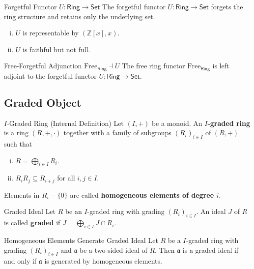 \begin{example}{Forgetful Functor $U:\mathsf{Ring}\to\mathsf{Set}$}{}
    The forgetful functor $U:\mathsf{Ring}\to\mathsf{Set}$ forgets the ring structure and retains only the underlying set.
    \begin{enumerate}[(i)]
        \item $U$ is representable by $\left(\mathbb{Z}[x],x\right)$.
        \item $U$ is faithful but not full.
    \end{enumerate}
\end{example}


\begin{proposition}{Free-Forgetful Adjunction $\mathrm{Free}_{\mathsf{Ring}}\dashv U$}{}
    The free ring functor $\mathrm{Free}_{\mathsf{Ring}}$ is left adjoint to the forgetful functor $U:\mathsf{Ring}\to\mathsf{Set}$.
\end{proposition}




\subsection{Graded Object}
\begin{definition}{$I$-Graded Ring (Internal Definition)}{}
    Let $(I,+)$ be a monoid. An \textbf{$I$-graded ring} is a ring $(R,+,\cdot)$ together with a family of subgroups $(R_i)_{i\in I}$ of $(R,+)$ such that
    \begin{enumerate}[(i)]
        \item $R=\bigoplus_{i\in I}R_i$.
        \item $R_iR_j\subseteq R_{i+j}$ for all $i,j\in I$.
    \end{enumerate}
    Elements in $R_i-\{0\}$ are called \textbf{homogeneous elements of degree $i$}.
\end{definition}

\begin{definition}{Graded Ideal}{}
    Let $R$ be an $I$-graded ring with grading $(R_i)_{i\in I}$. An ideal $J$ of $R$ is called \textbf{graded} if $J=\bigoplus_{i\in I}J\cap R_i$.
\end{definition}

\begin{proposition}{Homogeneous Elements Generate Graded Ideal}{}
    Let $R$ be a $I$-graded ring with grading $(R_i)_{i\in I}$ and $\mathfrak{a}$ be a two-sided ideal of $R$. Then $\mathfrak{a}$ is a graded ideal if and only if $\mathfrak{a}$ is generated by homogeneous elements.
\end{proposition}


